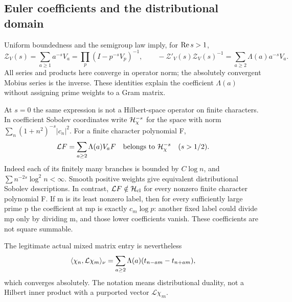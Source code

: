 \subsection{Euler coefficients and the distributional domain}
Uniform boundedness and the semigroup law imply, for $\operatorname{Re} s>1$,
\begin{equation}
\mathcal Z_V(s)=\sum_{a\ge1}a^{-s}V_a
=\prod_p(I-p^{-s}V_p)^{-1},\qquad
-\mathcal Z'_V(s)\mathcal Z_V(s)^{-1}
=\sum_{a\ge2}\Lambda(a)a^{-s}V_a.
\end{equation}
All series and products here converge in operator norm; the
absolutely convergent Mobius series is the inverse. These identities
explain the coefficient $\Lambda(a)$ without assigning prime
weights to a Gram matrix.

At $s=0$ the same expression is not a Hilbert-space operator on
finite characters. In coefficient Sobolev coordinates write
$\mathcal H^{-s}_{\chi}$ for the space with norm
$\sum_n(1+n^2)^{-s}|c_n|^2$. For a finite character polynomial F,
\begin{equation}\label{eq:L-domain}
\mathcal L F=\sum_{a\ge2}\Lambda(a)V_aF
\quad\hbox{belongs to }\mathcal H^{-s}_{\chi}\quad(s>1/2).
\end{equation}
Indeed each of its finitely many branches is bounded by
$C\log n$, and $\sum n^{-2s}\log^2n<\infty$.
Smooth positive weights give equivalent distributional Sobolev
descriptions. In contrast, $\mathcal LF\notin\mathcal H_{\rm cl}$ for
every nonzero finite character polynomial F. If m is its least
nonzero label, then for every sufficiently large prime p the
coefficient at mp is exactly $c_m\log p$: another fixed label
could divide mp only by dividing m, and those lower coefficients
vanish. These coefficients are not square summable.

The legitimate actual mixed matrix entry is nevertheless
\begin{equation}\label{eq:prime-distribution}
\langle \chi_n,\mathcal L\chi_m\rangle_\nu
=\sum_{a\ge2}\Lambda(a)(t_{n-am}-t_{n+am}),
\end{equation}
which converges absolutely. The notation means distributional
duality, not a Hilbert inner product with a purported vector
$\mathcal L\chi_m$.

